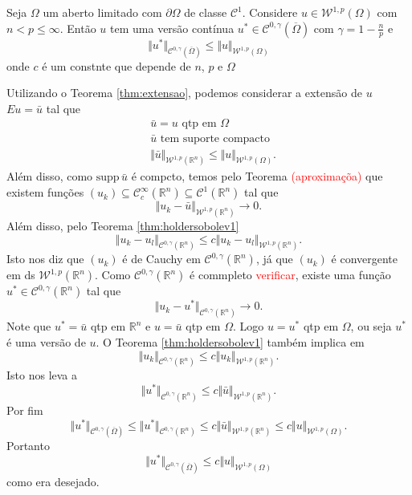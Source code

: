 \documentclass[a4paper, 11pt]{book}
\theoremstyle{definition}
\newcommand{\bR}{\mathbb{R}}
\newcommand{\cC}{\mathcal{C}}
\newcommand{\cW}{\mathcal{W}}
\newcommand{\supp}{\mathrm{supp}\,}
\begin{document}
\begin{tbox}
    Seja $\Omega$ um aberto limitado com $\partial\Omega$ de classe $\cC^1$.
    Considere $u \in \cW^{1,p}(\Omega)$ com $n < p \leqslant \infty$.
    Então $u$ tem uma versão contínua $u^* \in \cC^{0,\gamma}(\overline\Omega)$ com $\gamma = 1 - \frac{n}{p}$ e
    \[
        \Vert u^*  \Vert_{\cC^{0,\gamma}(\overline\Omega)} \leqslant \Vert u \Vert_{\cW^{1,p}(\Omega)}
    \]
    onde $c$ é um constnte que depende de $n$, $p$ e $\Omega$
\end{tbox}
\begin{prf}
    Utilizando o Teorema \ref{thm:extensao}, podemos considerar a extensão de $u$ $Eu = \bar u$ tal que
    \[
        \begin{aligned}
            &\bar u = u \text{ qtp em } \Omega\\
            &\bar u \text{ tem suporte compacto}\\
            &\Vert \bar u \Vert_{\cW^{1,p}(\bR^n)} \leqslant \Vert u \Vert_{\cW^{1,p}(\Omega)}.
        \end{aligned}
    \]
    Além disso, como $\supp \bar u$ é compcto, temos pelo Teorema \textcolor{red}{(aproximaçõa)} que existem funções $(u_k) \subseteq \cC^\infty_c(\bR^n) \subseteq \cC^1(\bR^n)$ tal que
    \[
        \Vert u_k - \bar u \Vert_{\cW^{1,p}(\bR^n)} \to 0.
    \]
    Além disso, pelo Teorema \ref{thm:holdersobolev1}
    \[
        \Vert u_k -u_l \Vert_{\cC^{0,\gamma}(\bR^n)} \leqslant c \Vert u_k - u_l \Vert_{\cW^{1,p}(\bR^n)}.
    \]
    Isto nos diz que $(u_k)$ é de Cauchy em $\cC^{0,\gamma}(\bR^n)$, já que $(u_k)$ é convergente em ds $\cW^{1,p}(\bR^n)$.
    Como $\cC^{0,\gamma}(\bR^n)$ é commpleto \textcolor{red}{verificar}, existe uma função $u^* \in \cC^{0,\gamma}(\bR^n)$ tal que
    \[
        \Vert u_k - u^* \Vert_{\cC^{0,\gamma}(\bR^n)} \to 0.
    \]
    Note que $u^* = \bar u$ qtp em $\bR^n$ e $u = \bar u$ qtp em $\Omega$.
    Logo $u = u^*$ qtp em $\Omega$, ou seja $u^*$ é uma versão de $u$.
    O Teorema \ref{thm:holdersobolev1} também implica em
    \[
        \Vert u_k \Vert_{\cC^{0,\gamma}(\bR^n)} \leqslant c \Vert u_k \Vert_{\cW^{1,p}(\bR^n)}.
    \]
    Isto nos leva a
    \[
        \Vert u^* \Vert_{\cC^{0,\gamma}(\bR^n)} \leqslant c \Vert \bar u \Vert_{\cW^{1,p}(\bR^n)}.
    \]
    Por fim
    \[
        \Vert u^* \Vert_{\cC^{0,\gamma}(\overline \Omega)} \leqslant \Vert u^* \Vert_{\cC^{0,\gamma}(\bR^n)} \leqslant c \Vert \bar u \Vert_{\cW^{1,p}(\bR^n)} \leqslant c \Vert u \Vert_{\cW^{1,p}(\Omega)}.
    \]
    Portanto
    \[
        \Vert u^* \Vert_{\cC^{0,\gamma}(\overline\Omega)} \leqslant c \Vert u \Vert_{\cW^{1,p}(\Omega)}
    \]
    como era desejado.
\end{prf}
\end{document}
